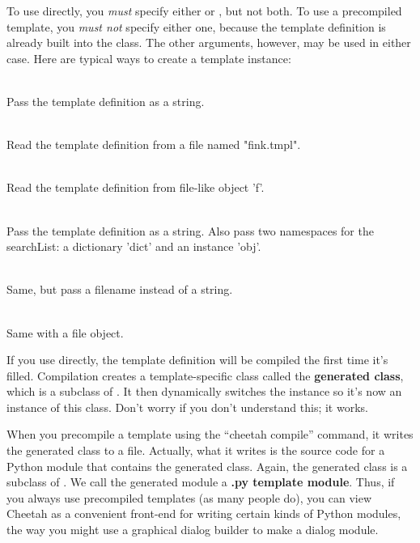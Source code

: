 To use  directly, you {\em must} specify either 
or , but not both.  To use a precompiled template, you 
{\em must not} specify either one, because the template definition is already
built into the class.  The other arguments, however, may be used in either case.
Here are typical ways to create a template instance:
\begin{description}
\item{}
     \\ Pass the template definition as a string.
\item{}
     \\ Read the template definition from a file named "fink.tmpl".  
\item{}
     \\ Read the template definition from file-like object 'f'.
\item{}
     \\ Pass the template definition as a string.  Also pass two namespaces for
     the searchList: a dictionary 'dict' and an instance 'obj'.
\item{}
     \\ Same, but pass a filename instead of a string.
\item{}
     \\ Same with a file object.
\end{description}

If you use  directly, the template definition will be compiled
the first time it's filled.  Compilation creates a template-specific class
called the {\bf generated class}, which is a subclass of .  It
then dynamically switches the instance so it's now an instance of this class.
Don't worry if you don't understand this; it works.


When you precompile a template using the ``cheetah compile'' command, it 
writes the generated class to a file.  Actually, what it writes is the source
code for a Python module that contains the generated class.  Again, the
generated class is a subclass of .  We call the generated
module a {\bf .py template module}.  Thus, if you always use
precompiled templates (as many people do), you can view Cheetah as a 
convenient front-end for writing certain kinds of Python modules, the way
you might use a graphical dialog builder to make a dialog module.  

